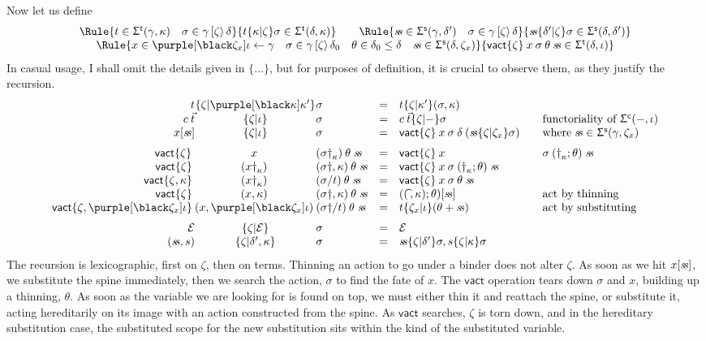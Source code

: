\documentclass[natbib]{article}
\newcommand{\EC}{\mathcal{E}}
\begin{document}
Now let us define
\newcommand{\vact}{\mathsf{vact}}
\[\begin{array}{c}
\Rule{t\in\Sgt\gamma\kappa\quad \sigma\in\act\gamma\zeta\delta}
     {t\{\kappa | \zeta\}\sigma\in\Sgt\delta\kappa}
\qquad
\Rule{\sss\in\Sgs\gamma{\delta'}\quad \sigma\in\act\gamma\zeta\delta}
     {\sss\{\delta' | \zeta\}\sigma\in\Sgs\delta{\delta'}}
\\
\Rule{x\in \bnd{\zeta_x}\iota\fae\gamma \quad \sigma\in\act\gamma\zeta{\delta_0} \quad \theta\in\delta_0\le\delta \quad
      \sss\in\Sgs\delta{\zeta_x}}
     {\vact\{\zeta\}\:x\:\sigma\:\theta\:\sss \in \Sgt\delta\iota}
\end{array}\]
In casual usage, I shall omit the details given in $\{\ldots\}$, but for purposes of definition, it is crucial to observe them,
as they justify the recursion.
\[\begin{array}{r@{}c@{}lcl@{\qquad}l}
t&\{ \zeta | \bnd\kappa\kappa'\}&\sigma & = & t\{\zeta | \kappa'\}(\sigma,\kappa) \\
c\:\vec{t}&\{\zeta | \iota\}&\sigma & = & c\:\vec{t}\{\zeta | -\}\sigma & \mbox{functoriality of $\Sgc-\iota$}\\
x[\sss]&\{\zeta | \iota\}&\sigma & = & \vact\{\zeta\}\:x\:\sigma\:\delta\:(\sss\{\zeta|\zeta_x\}\sigma)
  & \mbox{where}\;\sss\in \Sgs\gamma{\zeta_x} \medskip \\
\vact\{\zeta\}\;&x\:&(\sigma\dag_\kappa)\:\theta\;\sss & = &
  \vact\{\zeta\}\:x\:&\sigma\:(\dag_\kappa;\theta)\;\sss \\
\vact\{\zeta\}\:&(x\dag_\kappa)\:&(\sigma\dag,\kappa)\:\theta\;\sss & =
   &\vact\{\zeta\}\:x\:\sigma\:(\dag_\kappa;\theta)\;\sss \\
\vact\{\zeta,\kappa\}\:&(x\dag_\kappa)\:&(\sigma/t)\:\theta\;\sss & =
   &\vact\{\zeta\}\:x\:\sigma\:\theta\;\sss \\
\vact\{\zeta\}\:&(x,\kappa)\:&(\sigma\dag,\kappa)\:\theta\;\sss & =
   &((\tct{\,},\kappa);\theta)[\sss] & \mbox{act by thinning}\\
\vact\{\zeta,\bnd{\zeta_x}\iota\}\:&(x,\bnd{\zeta_x}\iota)\:&(\sigma\dag/t)\:\theta\;\sss & =
   & t\{\zeta_x|\iota\}(\theta+\sss) & \mbox{act by substituting}\medskip\\
\EC & \{\zeta | \EC\} & \sigma & = & \EC\\
(\sss,s) & \{\zeta | \delta',\kappa\} & \sigma & = & \sss \{\zeta | \delta'\}\sigma, s\{\zeta | \kappa\}\sigma \\
\end{array}\]
The recursion is lexicographic, first on $\zeta$, then on terms. Thinning an action to go under a binder does not alter $\zeta$. As soon as we hit $x[\mathit{s\!s}]$, we substitute the spine immediately, then we search the action, $\sigma$ to find the fate of $x$. The $\vact$ operation tears down $\sigma$ and $x$, building up a thinning, $\theta$. As soon as the variable we are looking for is found on top, we must either thin it and reattach the spine, or substitute it, acting hereditarily on its image with an action constructed from the spine. As $\vact$ searches, $\zeta$ is torn down, and in the hereditary substitution case, the substituted scope for the new substitution sits within the kind of the substituted variable.




\end{document}
